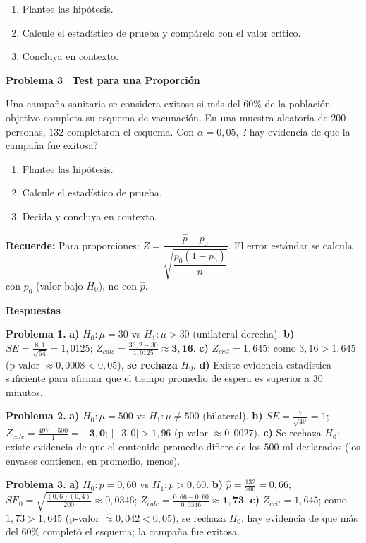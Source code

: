\documentclass[10pt,letterpaper]{article}
\newcommand{\seccion}[1]{%
  \vspace{2pt}%
  \begin{tcolorbox}[enhanced,colback=white,colframe=black,arc=0pt,boxrule=0pt,
    leftrule=2pt,left=6pt,right=6pt,top=1pt,bottom=1pt]
    {\normalsize\bfseries\sffamily #1}
  \end{tcolorbox}%
  \vspace{1pt}%
}
\newcommand{\reglacaja}[1]{%
  \begin{tcolorbox}[enhanced,colback=white,colframe=black,arc=0pt,boxrule=0.5pt,
    left=6pt,right=6pt,top=2pt,bottom=2pt,breakable]
  \small\sffamily #1
  \end{tcolorbox}%
}
\begin{document}
\begin{enumerate}[leftmargin=1.2cm, label=\textbf{\alph*)}, itemsep=2pt, topsep=2pt]
  \item Plantee las hip\'otesis.
  \item Calcule el estad\'istico de prueba y comp\'arelo con el valor cr\'itico.
  \item Concluya en contexto.
\end{enumerate}

\seccion{Problema 3 \textendash\ Test para una Proporci\'on}

\noindent\sffamily\small Una campa\~na sanitaria se considera exitosa si m\'as del $60\%$ de la poblaci\'on objetivo completa su esquema de vacunaci\'on. En una muestra aleatoria de $200$ personas, $132$ completaron el esquema. Con $\alpha=0{,}05$, ?`hay evidencia de que la campa\~na fue exitosa?

\begin{enumerate}[leftmargin=1.2cm, label=\textbf{\alph*)}, itemsep=2pt, topsep=2pt]
  \item Plantee las hip\'otesis.
  \item Calcule el estad\'istico de prueba.
  \item Decida y concluya en contexto.
\end{enumerate}

\reglacaja{%
\textbf{Recuerde:} Para proporciones: $Z=\dfrac{\hat{p}-p_0}{\sqrt{\dfrac{p_0(1-p_0)}{n}}}$. El error est\'andar se calcula con $p_0$ (valor bajo $H_0$), no con $\hat{p}$.%
}

\newpage

\seccion{Respuestas}

\small\sffamily
\textbf{Problema 1.}
\textbf{a)} $H_0:\mu=30$ vs $H_1:\mu>30$ (unilateral derecha).
\textbf{b)} $SE=\frac{8{,}1}{\sqrt{64}}=1{,}0125$; $Z_{calc}=\frac{33{,}2-30}{1{,}0125}\approx\mathbf{3{,}16}$.
\textbf{c)} $Z_{crit}=1{,}645$; como $3{,}16>1{,}645$ (p-valor $\approx0{,}0008<0{,}05$), \textbf{se rechaza} $H_0$.
\textbf{d)} Existe evidencia estad\'istica suficiente para afirmar que el tiempo promedio de espera es superior a $30$ minutos.

\medskip
\textbf{Problema 2.}
\textbf{a)} $H_0:\mu=500$ vs $H_1:\mu\neq500$ (bilateral).
\textbf{b)} $SE=\frac{7}{\sqrt{49}}=1$; $Z_{calc}=\frac{497-500}{1}=\mathbf{-3{,}0}$; $|{-3{,}0}|>1{,}96$ (p-valor $\approx0{,}0027$).
\textbf{c)} Se rechaza $H_0$: existe evidencia de que el contenido promedio difiere de los $500$ ml declarados (los envases contienen, en promedio, menos).

\medskip
\textbf{Problema 3.}
\textbf{a)} $H_0:p=0{,}60$ vs $H_1:p>0{,}60$.
\textbf{b)} $\hat{p}=\frac{132}{200}=0{,}66$; $SE_0=\sqrt{\frac{(0{,}6)(0{,}4)}{200}}\approx0{,}0346$; $Z_{calc}=\frac{0{,}66-0{,}60}{0{,}0346}\approx\mathbf{1{,}73}$.
\textbf{c)} $Z_{crit}=1{,}645$; como $1{,}73>1{,}645$ (p-valor $\approx0{,}042<0{,}05$), se rechaza $H_0$: hay evidencia de que m\'as del $60\%$ complet\'o el esquema; la campa\~na fue exitosa.
\end{document}
